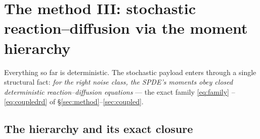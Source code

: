 \section{The method III: stochastic reaction--diffusion via the moment hierarchy}
\label{sec:stochastic}

Everything so far is deterministic. The stochastic payload enters through a
single structural fact: \emph{for the right noise class, the SPDE's moments obey
closed deterministic reaction--diffusion equations} --- the exact family
\eqref{eq:family} -- \eqref{eq:coupledrd} of \S\ref{sec:method}--\ref{sec:coupled}.

\subsection{The hierarchy and its exact closure}

